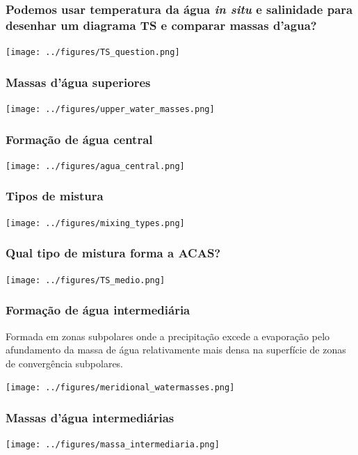 \begin{frame}
\frametitle{\small Podemos usar temperatura da água {\it in situ} e salinidade para
desenhar um diagrama TS e comparar massas d'agua?}
  \begin{center}
    \texttt{[image: ../figures/TS\_question.png]}
  \end{center}
\end{frame}


\begin{frame}
\frametitle{Massas d'água superiores}
  \begin{center}
    \texttt{[image: ../figures/upper\_water\_masses.png]}
  \end{center}
\end{frame}


\begin{frame}
\frametitle{Formação de água central}
  \begin{center}
    \texttt{[image: ../figures/agua\_central.png]}
  \end{center}
\end{frame}


\begin{frame}
\frametitle{Tipos de mistura}
  \begin{center}
    \texttt{[image: ../figures/mixing\_types.png]}
  \end{center}
\end{frame}


\begin{frame}
\frametitle{\small Qual tipo de mistura forma a ACAS?}
  \begin{center}
    \texttt{[image: ../figures/TS\_medio.png]}
  \end{center}
\end{frame}


\begin{frame}
\frametitle{Formação de água intermediária}
{\small
\begin{block}{}
  Formada em zonas subpolares onde a precipitação excede a evaporação pelo
  afundamento da massa de água relativamente mais densa na superfície
  de zonas de convergência subpolares.
\end{block}
}
  \begin{center}
    \texttt{[image: ../figures/meridional\_watermasses.png]}
  \end{center}
\end{frame}


\begin{frame}
\frametitle{Massas d'água intermediárias}
  \begin{center}
    \texttt{[image: ../figures/massa\_intermediaria.png]}
  \end{center}
\end{frame}


